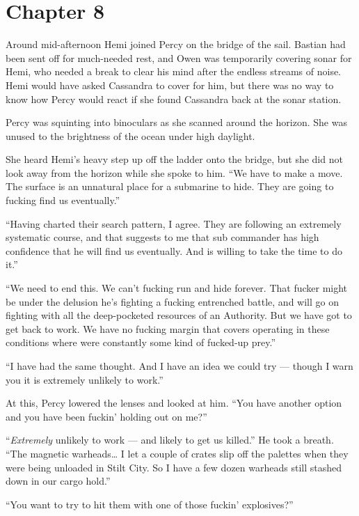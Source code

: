 \documentclass[
]{scrbook}
\begin{document}
\hypertarget{chapter-8}{%
\chapter*{Chapter 8}\label{chapter-8}}

Around mid-afternoon Hemi joined Percy on the bridge of the sail.
Bastian had been sent off for much-needed rest, and Owen was temporarily
covering sonar for Hemi, who needed a break to clear his mind after the
endless streams of noise. Hemi would have asked Cassandra to cover for
him, but there was no way to know how Percy would react if she found
Cassandra back at the sonar station.

Percy was squinting into binoculars as she scanned around the horizon.
She was unused to the brightness of the ocean under high daylight.

She heard Hemi's heavy step up off the ladder onto the bridge, but she
did not look away from the horizon while she spoke to him. ``We have to
make a move. The surface is an unnatural place for a submarine to hide.
They are going to fucking find us eventually.''

``Having charted their search pattern, I agree. They are following an
extremely systematic course, and that suggests to me that sub commander
has high confidence that he will find us eventually. And is willing to
take the time to do it.''

``We need to end this. We can't fucking run and hide forever. That
fucker might be under the delusion he's fighting a fucking entrenched
battle, and will go on fighting with all the deep-pocketed resources of
an Authority. But we have got to get back to work. We have no fucking
margin that covers operating in these conditions where were constantly
some kind of fucked-up prey.''

``I have had the same thought. And I have an idea we could try ---
though I warn you it is extremely unlikely to work.''

At this, Percy lowered the lenses and looked at him. ``You have another
option and you have been fuckin' holding out on me?''

``\emph{Extremely} unlikely to work --- and likely to get us killed.''
He took a breath. ``The magnetic warheads\ldots{} I let a couple of
crates slip off the palettes when they were being unloaded in Stilt
City. So I have a few dozen warheads still stashed down in our cargo
hold.''

``You want to try to hit them with one of those fuckin' explosives?''
\end{document}
